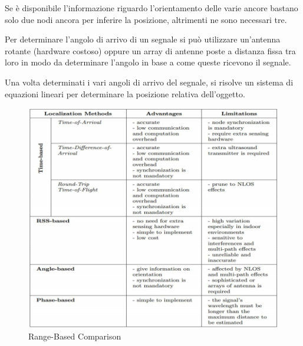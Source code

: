 \begin{itemize}
    Se è disponibile l'informazione riguardo l'orientamento delle varie ancore bastano solo due nodi ancora per inferire la posizione, altrimenti ne sono necessari tre.

    Per determinare l’angolo di arrivo di un segnale si può utilizzare un'antenna rotante (hardware costoso) oppure un array di antenne poste a distanza fissa tra loro in modo da determinare l'angolo in base a come queste ricevono il segnale.

    Una volta determinati i vari angoli di arrivo del segnale, si risolve un sistema di equazioni lineari per determinare la posizione relativa dell'oggetto.
\end{itemize}

\begin{figure}
        \centering
        \includegraphics[scale=0.55]{fig4-lec3pt1.png}
        \caption{Range-Based Comparison}
        \label{fig:fig4-lec3pt1}
\end{figure}


